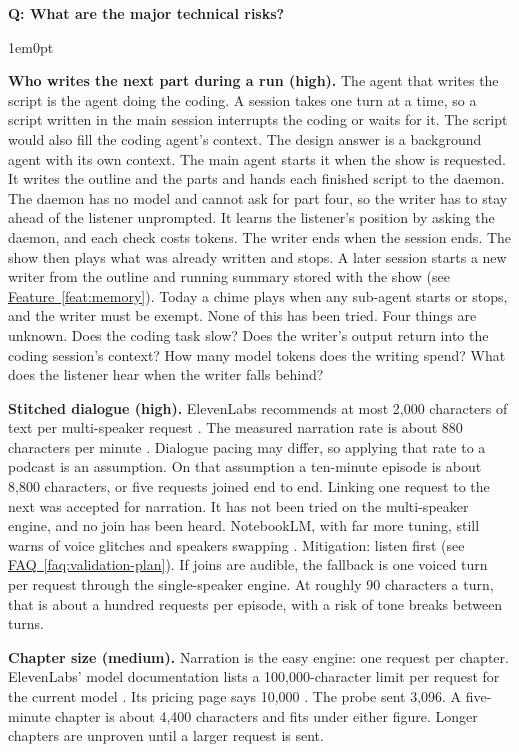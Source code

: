 \documentclass[11pt,letterpaper]{article} %
\newcounter{faqnum} %
\newenvironment{faqpair}[1]{%
  \needspace{4\baselineskip}%
  \vspace{0.5em}%
  \refstepcounter{faqnum}%
  \noindent\textbf{\color{SectionBlue}Q\thefaqnum: #1}\par\nopagebreak[4]%
  \vspace{0.2em}%
  \begin{adjustwidth}{1em}{0pt}%
  \setlength{\parindent}{0pt}%
  \setlength{\parskip}{0.5em}%
}{%
  \end{adjustwidth}%
  \vspace{0.5em}%
}
\newcommand{\faqref}[1]{\hyperref[#1]{FAQ~\ref*{#1}}}
\newcommand{\featureref}[1]{\hyperref[#1]{Feature~\ref*{#1}}}
\begin{document}
\begin{faqpair}{What are the major technical risks?}\label{faq:tech-risks}

  \textbf{Who writes the next part during a run (high).} The agent that
  writes the script is the agent doing the coding. A session takes one turn
  at a time, so a script written in the main session interrupts the coding
  or waits for it. The script would also fill the coding agent's context.
  The design answer is a background agent with its own context. The main
  agent starts it when the show is requested. It writes the outline and the
  parts and hands each finished script to the daemon. The daemon has no
  model and cannot ask for part four, so the writer has to stay ahead of
  the listener unprompted. It learns the listener's position by asking the
  daemon, and each check costs tokens. The writer ends when the session
  ends. The show then plays what was already written and stops. A later
  session starts a new writer from the outline and running summary stored
  with the show (see \featureref{feat:memory}). Today a chime plays when
  any sub-agent starts or stops, and the writer must be exempt. None of
  this has been tried. Four things are unknown. Does the coding task slow?
  Does the writer's output return into the coding session's context? How
  many model tokens does the writing spend? What does the listener hear
  when the writer falls behind?

  \textbf{Stitched dialogue (high).} ElevenLabs recommends at most 2,000
  characters of text per multi-speaker request
  \cite{elevenlabs2026dialogue}. The measured narration rate is about 880
  characters per minute \cite{voxspike2026audiobook}. Dialogue pacing may
  differ, so applying that rate to a podcast is an assumption. On that
  assumption a ten-minute episode is about 8,800 characters, or five
  requests joined end to end. Linking one request to the next was accepted
  for narration. It has not been tried on the multi-speaker engine, and no
  join has been heard. NotebookLM, with far more tuning, still warns of voice
  glitches and speakers swapping \cite{notebooklm2026audiooverview}.
  Mitigation: listen first (see \faqref{faq:validation-plan}). If joins are
  audible, the fallback is one voiced turn per request through the
  single-speaker engine. At roughly 90 characters a turn, that is about a
  hundred requests per episode, with a risk of tone breaks between turns.

  \textbf{Chapter size (medium).} Narration is the easy engine: one request
  per chapter. ElevenLabs' model documentation lists a 100,000-character
  limit per request for the current model \cite{elevenlabs2026models}. Its
  pricing page says 10,000 \cite{elevenlabs2026pricing}. The probe sent
  3,096. A five-minute chapter is about 4,400 characters and fits under
  either figure. Longer chapters are unproven until a larger request is
  sent.


\end{faqpair}
\end{document}
